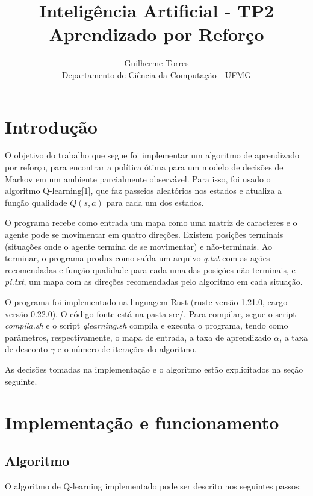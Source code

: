 \documentclass[11pt]{article}
\begin{document}
\title{Inteligência Artificial - TP2\\Aprendizado por Reforço}
\author{Guilherme Torres\\Departamento de Ciência da Computação - UFMG}
\date{}
\maketitle

\section{Introdução}

O objetivo do trabalho que segue foi implementar um algoritmo de aprendizado por reforço, para encontrar a política ótima para um modelo de decisões de Markov em um ambiente parcialmente observável. Para isso, foi usado o algoritmo Q-learning[1], que faz passeios aleatórios nos estados e atualiza a função qualidade $Q(s, a)$ para cada um dos estados.

O programa recebe como entrada um mapa como uma matriz de caracteres e o agente pode se movimentar em quatro direções. Existem posições terminais (situações onde o agente termina de se movimentar) e não-terminais. Ao terminar, o programa produz como saída um arquivo \textit{q.txt} com as ações recomendadas e função qualidade para cada uma das posições não terminais, e \textit{pi.txt}, um mapa com as direções recomendadas pelo algoritmo em cada situação.

O programa foi implementado na linguagem Rust (rustc versão 1.21.0, cargo versão 0.22.0). O código fonte está na pasta src/. Para compilar, segue o script \textit{compila.sh} e o script \textit{qlearning.sh} compila e executa o programa, tendo como parâmetros, respectivamente, o mapa de entrada, a taxa de aprendizado $\alpha$, a taxa de desconto $\gamma$ e o número de iterações do algoritmo.

As decisões tomadas na implementação e o algoritmo estão explicitados na seção seguinte.

\section{Implementação e funcionamento}

\subsection{Algoritmo}

O algoritmo de Q-learning implementado pode ser descrito nos seguintes passos:
\end{document}
